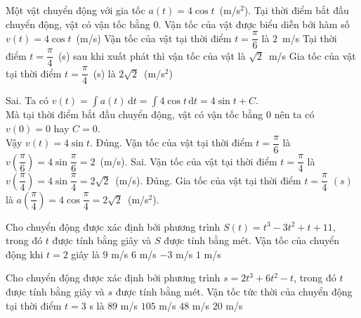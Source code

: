 \begin{ex}%
Một vật chuyển động với gia tốc $ a(t)=4\cos t$~(m/s$^2$). Tại thời điểm bắt đầu chuyển động, vật có vận tốc bằng $0$.
\choiceTF
{Vận tốc của vật được biểu diễn bởi hàm số $v(t)=4\cos t$~(m/s)}
{\True Vận tốc của vật tại thời điểm $ t=\dfrac{\pi}{6}$ là $2$~m/s}
{Tại thời điểm $ t=\dfrac{\pi}{4}$~(s) sau khi xuất phát thì vận tốc của vật là $\sqrt{2}$~m/s}
{\True Gia tốc của vật tại thời điểm $ t=\dfrac{\pi}{4}$~(s) là $2\sqrt{2}$~(m/s$^2$)}
\loigiai
{
	\begin{itemchoice}
	\itemch Sai. Ta có $ v(t)=\displaystyle\int a(t)\mathrm{\,d}t=\displaystyle\int 4\cos t\mathrm{\,d}t=4\sin t+C$.\\
	Mà tại thời điểm bắt đầu chuyển động, vật có vận tốc bằng $0$ nên ta có $v(0)=0$ hay $C=0$.\\
	Vậy $v(t)=4\sin t$.
	\itemch Đúng. Vận tốc của vật tại thời điểm $t=\dfrac{\pi}{6}$ là $ v\left(\dfrac{\pi}{6}\right)=4\sin \dfrac{\pi}{6}=2$~(m/s).
	\itemch Sai. Vận tốc của vật tại thời điểm $ t=\dfrac{\pi}{4}$ là $ v\left(\dfrac{\pi}{4}\right)=4\sin \dfrac{\pi}{4}=2\sqrt{2}$~(m/s).
	\itemch Đúng. Gia tốc của vật tại thời điểm $t=\dfrac{\pi}{4}$ $(s)$ là $ a\left(\dfrac{\pi}{4}\right)=4\cos \dfrac{\pi}{4}=2\sqrt{2}$~(m/s$^2$).
	\end{itemchoice}
}
\end{ex}

\begin{ex}%
	Cho chuyển động được xác định bởi phương trình $S(t)=t^{3}-3t^{2}+t+11$, trong đó $t$ được tính bằng giây và $S$ được tính bằng mét. Vận tốc của chuyển động khi $t=2$  giây là
	\choice 
		{$9$ m/s} 
		 {$6$ m/s}
		 {$-3$ m/s}
		{\True $1$  m/s}
\end{ex}

\begin{ex}%
	Cho chuyển động được xác định bởi phương trình $s=2t^3+6t^2-t$, trong đó $t$ được tính bằng giây và $s$ được tính bằng mét. Vận tốc tức thời của chuyển động tại thời điểm $t=3$  s là
	 \choice
		{\True $89$ m/s} 
		{$105$  m/s}
		{$48$  m/s}
		{$20$ m/s} 
\end{ex}

